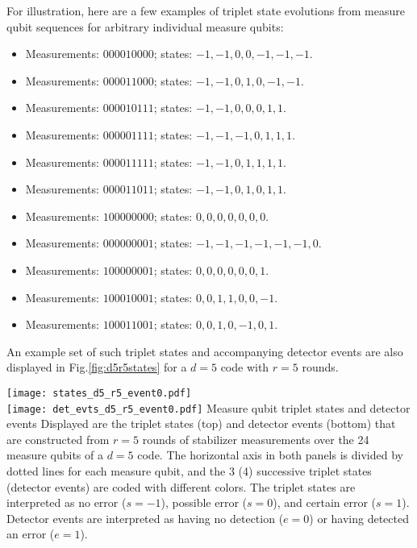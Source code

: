For illustration, here are a few examples of triplet state evolutions from measure qubit sequences for arbitrary individual measure qubits:
\begin{itemize}
\item Measurements: $000010000$; states: $-1,-1,0,0,-1,-1,-1$.
\item Measurements: $000011000$; states: $-1,-1,0,1,0,-1,-1$.
\item Measurements: $000010111$; states: $-1,-1,0,0,0,1,1$.
\item Measurements: $000001111$; states: $-1,-1,-1,0,1,1,1$.
\item Measurements: $000011111$; states: $-1,-1,0,1,1,1,1$.
\item Measurements: $000011011$; states: $-1,-1,0,1,0,1,1$.
\item Measurements: $100000000$; states: $0,0,0,0,0,0,0$.
\item Measurements: $000000001$; states: $-1,-1,-1,-1,-1,-1,0$.
\item Measurements: $100000001$; states: $0,0,0,0,0,0,1$.
\item Measurements: $100010001$; states: $0,0,1,1,0,0,-1$.
\item Measurements: $100011001$; states: $0,0,1,0,-1,0,1$.
\end{itemize}
An example set of such triplet states and accompanying detector events are also displayed in Fig.\ref{fig:d5r5states} for a $d=5$ code with $r=5$ rounds.

\begin{figure*}[htb]
\centering
\texttt{[image: states\_d5\_r5\_event0.pdf]} \\
\texttt{[image: det\_evts\_d5\_r5\_event0.pdf]}
\ccaption
{Measure qubit triplet states and detector events}
{
Displayed are the triplet states (top) and detector events (bottom) that are constructed from $r=5$ rounds of stabilizer measurements over the 24 measure qubits of a $d=5$ code. The horizontal axis in both panels is divided by dotted lines for each measure qubit, and the 3 (4) successive triplet states (detector events) are coded with different colors. The triplet states are interpreted as no error ($s=-1$), possible error ($s=0$), and certain error ($s=1$). Detector events are interpreted as having no detection ($e=0$) or having detected an error ($e=1$).
}
\label{fig:d5r5states}
\end{figure*}

